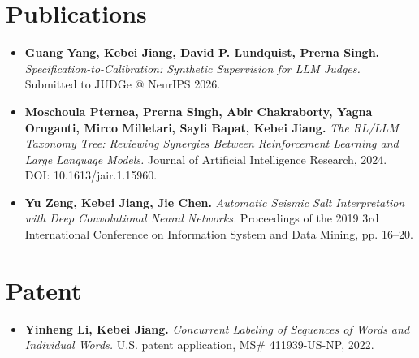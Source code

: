 \documentclass[10pt,letterpaper]{article}
\begin{document}
\section{Publications}
\begin{itemize}
\item \textbf{Guang Yang, Kebei Jiang, David P. Lundquist, Prerna Singh.} \textit{Specification-to-Calibration: Synthetic Supervision for LLM Judges.} Submitted to JUDGe @ NeurIPS 2026.
\item \textbf{Moschoula Pternea, Prerna Singh, Abir Chakraborty, Yagna Oruganti, Mirco Milletari, Sayli Bapat, Kebei Jiang.} \textit{The RL/LLM Taxonomy Tree: Reviewing Synergies Between Reinforcement Learning and Large Language Models.} Journal of Artificial Intelligence Research, 2024. DOI: 10.1613/jair.1.15960.
\item \textbf{Yu Zeng, Kebei Jiang, Jie Chen.} \textit{Automatic Seismic Salt Interpretation with Deep Convolutional Neural Networks.} Proceedings of the 2019 3rd International Conference on Information System and Data Mining, pp. 16--20.
\end{itemize}

\section{Patent}
\begin{itemize}
\item \textbf{Yinheng Li, Kebei Jiang.} \textit{Concurrent Labeling of Sequences of Words and Individual Words.} U.S. patent application, MS\# 411939-US-NP, 2022.
\end{itemize}
\end{document}
